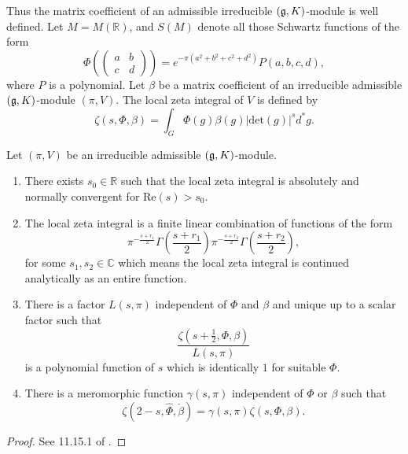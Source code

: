 Thus the matrix coefficient of an admissible irreducible $(\mathfrak g,K)$-module is well defined.
Let $M=M(\mathbb R)$, and $S(M)$ denote all those Schwartz functions of the form
\[ \Phi\left(\left (\begin{array}{cc}
a & b\\
c & d
\end{array} \right )\right )=e^{-\pi(a^2+b^2+c^2+d^2)} P(a,b,c,d),\]
where $P$ is a polynomial.
Let $\beta$ be a matrix coefficient of an irreducible admissible $(\mathfrak g,K)$-module $(\pi,V)$. The local zeta integral of $V$ is defined by
\[
\zeta(s,\Phi,\beta)=\int _G \Phi(g)\beta(g) \left | \mathrm {det} (g) \right |^s d^*g.
\]

\begin{theorem}\label{FE for real} 
Let $(\pi,V)$ be an irreducible admissible $(\mathfrak g,K)$-module.
\begin{enumerate}
\item There exists $s_0\in \mathbb R$ such that the local zeta integral is absolutely and normally convergent for $\mathrm {Re} (s)>s_0$.
\item The local zeta integral is a finite linear combination of functions of the form 
\[ \pi^{-\frac {s+r_1} 2} \Gamma\left (\frac {s+r_1} 2 \right ) \pi^{-\frac {s+r_2} 2} \Gamma\left (\frac {s+r_2} 2 \right ), \] 
for some $s_1,s_2\in \mathbb C$ which means the local zeta integral is continued analytically as an entire function.
\item There is a factor $L(s,\pi)$ independent of $\Phi$ and $\beta$ and unique up to a scalar factor such that 
\[ \frac {\zeta(s+\frac 1 2,\Phi,\beta)}{L(s,\pi)} \]
is a polynomial function of $s$ which is identically $1$ for suitable $\Phi$.
\item There is a meromorphic function $\gamma (s,\pi)$ independent of $\Phi$ or $\beta$ such that 
\[ \zeta(2-s,\widehat \Phi,\check \beta)=\gamma(s,\pi)\zeta (s,\Phi,\beta). \] 
\end{enumerate}
\end{theorem}

\begin{proof}
See 11.15.1 of .
\end{proof}
